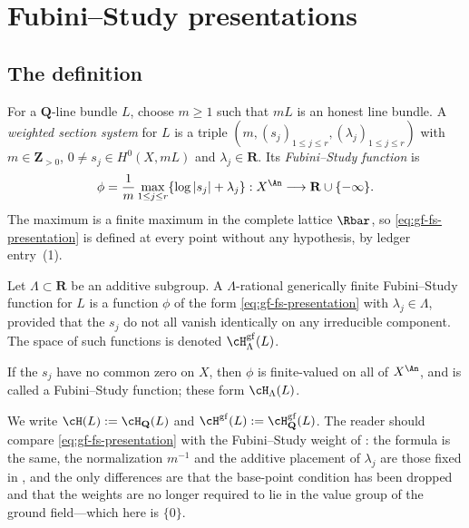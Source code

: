 \section{Fubini--Study presentations}
\label{sec:ch34-fs}

\subsection{The definition}

For a $\mathbf Q$-line bundle $L$, choose $m\geq1$ such that $mL$
is an honest line bundle.  A \emph{weighted section system} for $L$ is a
triple $(m,(s_j)_{1\le j\le r},(\lambda_j)_{1\le j\le r})$ with
$m\in\mathbf Z_{>0}$, $0\ne s_j\in H^0(X,mL)$ and
$\lambda_j\in\mathbf R$.  Its \emph{Fubini--Study function} is
\begin{equation}
\label{eq:gf-fs-presentation}
 \phi=\frac1m\max_{1\leq j\leq r}\{\log|s_j|+\lambda_j\}
 :X^{\An}\longrightarrow\mathbf R\cup\{-\infty\}.
\end{equation}
The maximum is a finite maximum in the complete lattice $\Rbar$, so
\eqref{eq:gf-fs-presentation} is defined at every point without any
hypothesis, by ledger entry~(1).

\begin{definition}
\label{def:gf-fs-functions}
Let $\Lambda\subset\mathbf R$ be an additive subgroup.  A
$\Lambda$-rational generically finite Fubini--Study function for $L$ is
a function $\phi$ of the form \eqref{eq:gf-fs-presentation} with
$\lambda_j\in\Lambda$, provided that the $s_j$ do not all vanish
identically on any irreducible component.  The space of such functions is
denoted $\cH^{\mathrm{gf}}_\Lambda(L)$.

If the $s_j$ have no common zero on $X$, then $\phi$ is finite-valued
on all of $X^{\An}$, and is called a Fubini--Study function; these form
$\cH_\Lambda(L)$.
\end{definition}

We write $\cH(L):=\cH_{\mathbf Q}(L)$ and
$\cH^{\mathrm{gf}}(L):=\cH^{\mathrm{gf}}_{\mathbf Q}(L)$.  The reader
should compare \eqref{eq:gf-fs-presentation} with the Fubini--Study weight
of : the formula is the same, the normalization
$m^{-1}$ and the additive placement of $\lambda_j$ are those fixed in
, and the only differences are that the base-point
condition has been dropped and that the weights are no longer required to
lie in the value group of the ground field---which here is $\{0\}$.

